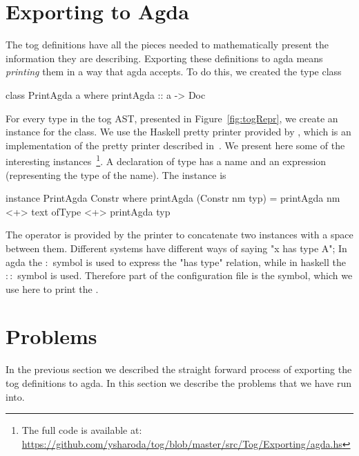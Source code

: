 \section{Exporting to Agda}
The tog definitions have all the pieces needed to mathematically present the information they are describing. Exporting these definitions to agda means \emph{printing} them in a way that agda accepts. To do this, we created the type class 
\begin{hscode}
class PrintAgda a where
  printAgda ::  a -> Doc   
\end{hscode}
For every type in the tog AST, presented in Figure~\ref{fig:togRepr}, we create an instance for the  class. 
We use the Haskell pretty printer provided by , which is an implementation of the pretty printer described in~\cite{wadler2003prettier}. 
We present here some of the interesting instances~\footnote{The full code is available at: \url{https://github.com/ysharoda/tog/blob/master/src/Tog/Exporting/agda.hs}}. 
A declaration of type  has a name and an expression (representing the type of the name). The instance  is 
\begin{hscode}
instance PrintAgda Constr where 
  printAgda (Constr nm typ)  =
    printAgda nm <+> text ofType <+> printAgda typ
\end{hscode}
The operator \lstmath{(<+>)} is provided by the printer to concatenate two  instances with a space between them. 
Different systems have different ways of saying "x has type A"; In agda the $\colon$ symbol is used to express the "has type" relation, while in haskell the $\colon\colon$ symbol is used. Therefore part of the configuration file is the  symbol, which we use here to print the . 

\section{Problems}
In the previous section we described the straight forward process of exporting the tog definitions to agda. In this section we describe the problems that we have run into. 

